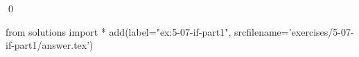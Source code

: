 
\begin{ex}
  \label{ex:5-07-if-part1}
  
  \qed
\end{ex}
\begin{python0}
from solutions import *
add(label="ex:5-07-if-part1",
    srcfilename='exercises/5-07-if-part1/answer.tex')
\end{python0}
